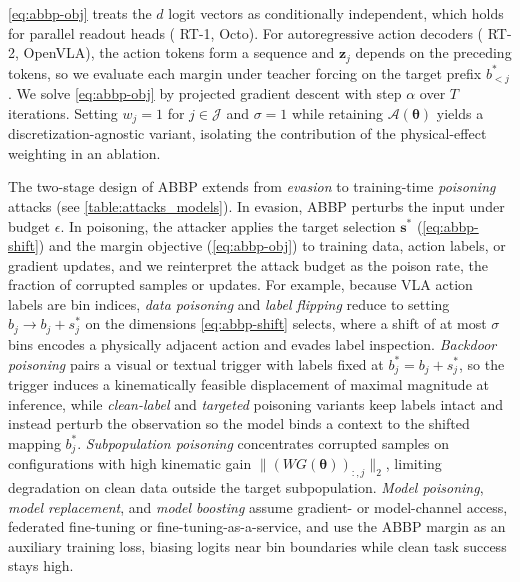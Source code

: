 \documentclass[11pt,letterpaper]{article}
\begin{document}
\autoref{eq:abbp-obj} treats the $d$ logit vectors as conditionally independent, which holds for parallel readout heads ({\eg} RT-1, Octo). For autoregressive action decoders ({\eg} RT-2, OpenVLA), the action tokens form a sequence and $\bm{z}_j$ depends on the preceding tokens, so we evaluate each margin under teacher forcing on the target prefix $b^{*}_{<j}$. We solve \autoref{eq:abbp-obj} by projected gradient descent with step $\alpha$ over $T$ iterations. Setting $w_j{=}1$ for $j\in\mathcal{J}$ and $\sigma{=}1$ while retaining $\mathcal{A}(\bm{\theta})$ yields a discretization-agnostic variant, isolating the contribution of the physical-effect weighting in an ablation.


 The two-stage design of ABBP extends from \emph{evasion} to training-time \emph{poisoning} attacks (see \autoref{table:attacks_models}). 
In evasion, ABBP perturbs the input under budget $\epsilon$. In poisoning, the attacker applies the
target selection $\bm{s}^{*}$ (\autoref{eq:abbp-shift}) and the margin objective
(\autoref{eq:abbp-obj}) to training data, action labels, or gradient updates, and we reinterpret the
attack budget as the poison rate, \ie the fraction of corrupted samples or updates.
For example,
because VLA action labels are bin indices, \emph{data poisoning} and \emph{label flipping} reduce to
setting $b_j \rightarrow b_j+s^{*}_{j}$ on the dimensions \autoref{eq:abbp-shift} selects, where a
shift of at most $\sigma$ bins encodes a physically adjacent action and evades label inspection. 
\emph{Backdoor poisoning} pairs a visual or textual trigger with labels fixed at $b_j^{*}=b_j+s_j^{*}$, so the trigger induces a kinematically feasible displacement of maximal magnitude at inference, while \emph{clean-label} and \emph{targeted} poisoning variants keep labels intact and instead
perturb the observation so the model binds a context to the shifted mapping $b^{*}_{j}$. 
\emph{Subpopulation poisoning} concentrates corrupted samples on configurations with high kinematic
gain $\|(WG(\bm{\theta}))_{:,j}\|_{2}$, limiting degradation on clean data outside the target
subpopulation.
\emph{Model poisoning}, \emph{model replacement}, and \emph{model boosting} assume gradient- or model-channel access, \eg federated fine-tuning or fine-tuning-as-a-service, and use the ABBP margin as an auxiliary training loss, biasing logits near bin boundaries while clean task success stays high. %
\end{document}
